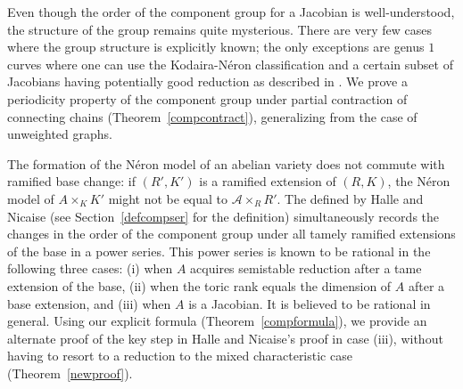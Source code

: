 Even though the order of the component group for a Jacobian is well-understood, the structure of the group remains quite mysterious. There are very few cases where the group structure is explicitly known; the only exceptions are genus $1$ curves where one can use the Kodaira-N\'{e}ron classification and a certain subset of Jacobians having potentially good reduction as described in \cite[Theorem~2.1]{lorpotgood} .
We prove a periodicity property of the component group under partial contraction of connecting chains (Theorem~\ref{compcontract}), generalizing \cite[Corollary~4.7]{bano} from the case of unweighted graphs. 

The formation of the N\'{e}ron model of an abelian variety does not commute with ramified base change: if $(R',K')$ is a ramified extension of $(R,K)$, the N\'{e}ron model of $A \times_K K'$ might not be equal to $\mathcal{A} \times_R R'$. The {} defined by Halle and Nicaise (see Section~\ref{defcompser} for the definition) simultaneously records the changes in the order of the component group under all tamely ramified extensions of the base in a power series. This power series is known to be rational in the following three cases: (i) when $A$ acquires semistable reduction after a tame extension of the base, (ii) when the toric rank equals the dimension of $A$ after a base extension, and (iii) when $A$ is a Jacobian. It is believed to be rational in general. Using our explicit formula (Theorem~\ref{compformula}), we provide an alternate proof of the key step in Halle and Nicaise's proof in case (iii), without having to resort to a reduction to the mixed characteristic case (Theorem~\ref{newproof}).



